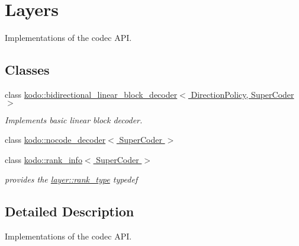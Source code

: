 \hypertarget{group__codec__layers}{\section{Layers}
\label{group__codec__layers}
}


Implementations of the codec A\-P\-I.  


\subsection*{Classes}
\begin{DoxyCompactItemize}
\item 
class \hyperlink{classkodo_1_1bidirectional__linear__block__decoder}{kodo\-::bidirectional\-\_\-linear\-\_\-block\-\_\-decoder$<$ Direction\-Policy, Super\-Coder $>$}
\begin{DoxyCompactList}\small\item\em Implements basic linear block decoder. \end{DoxyCompactList}\item 
class \hyperlink{classkodo_1_1nocode__decoder}{kodo\-::nocode\-\_\-decoder$<$ Super\-Coder $>$}
\item 
class \hyperlink{classkodo_1_1rank__info}{kodo\-::rank\-\_\-info$<$ Super\-Coder $>$}
\begin{DoxyCompactList}\small\item\em provides the \hyperlink{classlayer_a1de820b75c9af3faf024dee2b22599e4}{layer\-::rank\-\_\-type} typedef \end{DoxyCompactList}\end{DoxyCompactItemize}


\subsection{Detailed Description}
Implementations of the codec A\-P\-I. 